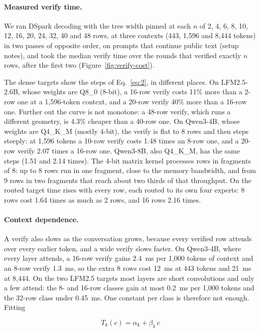 \documentclass[10pt,twocolumn,letterpaper]{article}
\begin{document}
\paragraph{Measured verify time.} We ran DSpark decoding with the tree width pinned at each $n$ of 2, 4, 6, 8, 10, 12, 16, 20, 24, 32, 40 and 48 rows, at three contexts (443, 1,596 and 8,444 tokens) in two passes of opposite order, on prompts that continue public text (setup notes), and took the median verify time over the rounds that verified exactly $n$ rows, after the first two (Figure~\ref{fig:verify-cost}).



The dense targets show the steps of Eq.~\eqref{eq:2}, in different places. On LFM2.5-2.6B, whose weights are Q8\_0 (8-bit), a 16-row verify costs 11\% more than a 2-row one at a 1,596-token context, and a 20-row verify 40\% more than a 16-row one. Further out the curve is not monotone: a 48-row verify, which runs a different geometry, is 4.3\% cheaper than a 40-row one. On Qwen3-4B, whose weights are Q4\_K\_M (mostly 4-bit), the verify is flat to 8 rows and then steps steeply: at 1,596 tokens a 10-row verify costs 1.48 times an 8-row one, and a 20-row verify 2.07 times a 16-row one. Qwen3-8B, also Q4\_K\_M, has the same steps (1.51 and 2.14 times). The 4-bit matrix kernel processes rows in fragments of 8: up to 8 rows run in one fragment, close to the memory bandwidth, and from 9 rows in two fragments that reach about two thirds of that throughput. On the routed target time rises with every row, each routed to its own four experts: 8 rows cost 1.64 times as much as 2 rows, and 16 rows 2.16 times.

\paragraph{Context dependence.} A verify also slows as the conversation grows, because every verified row attends over every earlier token, and a wide verify slows faster. On Qwen3-4B, where every layer attends, a 16-row verify gains 2.4~ms per 1,000 tokens of context and an 8-row verify 1.3~ms, so the extra 8 rows cost 12~ms at 443 tokens and 21~ms at 8,444. On the two LFM2.5 targets most layers are short convolutions and only a few attend: the 8- and 16-row classes gain at most 0.2~ms per 1,000 tokens and the 32-row class under 0.45~ms. One constant per class is therefore not enough. Fitting

\begin{equation}\label{eq:3}
T_k(c) = \alpha_k + \beta_k\, c
\end{equation}
\end{document}
